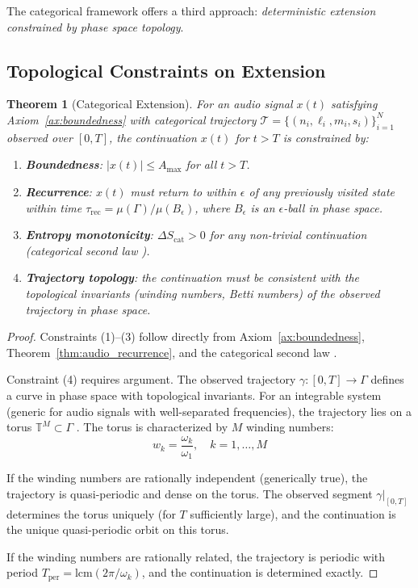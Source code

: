 \documentclass[twocolumn,10pt]{article}
\newtheorem{theorem}{Theorem}[section]
\theoremstyle{remark}
\newcommand{\Scat}{S_{\mathrm{cat}}}
\newcommand{\calT}{\mathcal{T}}
\begin{document}
The categorical framework offers a third approach: \textit{deterministic extension constrained by phase space topology}.

\subsection{Topological Constraints on Extension}

\begin{theorem}[Categorical Extension]
\label{thm:extension}
For an audio signal $x(t)$ satisfying Axiom~\ref{ax:boundedness} with categorical trajectory $\calT = \{(n_i, \ell_i, m_i, s_i)\}_{i=1}^{N}$ observed over $[0, T]$, the continuation $x(t)$ for $t > T$ is constrained by:
\begin{enumerate}
    \item \textbf{Boundedness}: $|x(t)| \leq A_{\max}$ for all $t > T$.
    \item \textbf{Recurrence}: $x(t)$ must return to within $\epsilon$ of any previously visited state within time $\tau_{\mathrm{rec}} = \mu(\Gamma)/\mu(B_\epsilon)$, where $B_\epsilon$ is an $\epsilon$-ball in phase space.
    \item \textbf{Entropy monotonicity}: $\Delta\Scat > 0$ for any non-trivial continuation (categorical second law \cite{sachikonye2026thermodynamics}).
    \item \textbf{Trajectory topology}: the continuation must be consistent with the topological invariants (winding numbers, Betti numbers) of the observed trajectory in phase space.
\end{enumerate}
\end{theorem}

\begin{proof}
Constraints (1)--(3) follow directly from Axiom~\ref{ax:boundedness}, Theorem~\ref{thm:audio_recurrence}, and the categorical second law \cite{sachikonye2026thermodynamics}.

Constraint (4) requires argument. The observed trajectory $\gamma: [0, T] \to \Gamma$ defines a curve in phase space with topological invariants. For an integrable system (generic for audio signals with well-separated frequencies), the trajectory lies on a torus $\mathbb{T}^M \subset \Gamma$ \cite{arnold1989}. The torus is characterized by $M$ winding numbers:
\begin{equation}
    w_k = \frac{\omega_k}{\omega_1}, \quad k = 1, \ldots, M
    \label{eq:winding_numbers}
\end{equation}

If the winding numbers are rationally independent (generically true), the trajectory is quasi-periodic and dense on the torus. The observed segment $\gamma|_{[0,T]}$ determines the torus uniquely (for $T$ sufficiently large), and the continuation is the unique quasi-periodic orbit on this torus.

If the winding numbers are rationally related, the trajectory is periodic with period $T_{\mathrm{per}} = \mathrm{lcm}(2\pi/\omega_k)$, and the continuation is determined exactly.
\end{proof}
\end{document}
